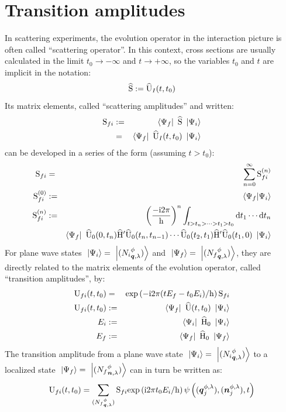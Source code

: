 \documentclass[10pt,a4paper,twoside,openany]{book}
\begin{document}
\section{Transition amplitudes}

In scattering experiments, the evolution operator in the interaction picture is often called ``scattering operator''. In this context, cross sections are usually calculated in the limit $t_0 \to - \infty$ and $t \to + \infty$, so the variables $t_0$ and $t$ are implicit in the notation:
\begin{equation*}
\widehat{\mathrm S} := \widehat{\mathrm U}_I({t},{t_0})
\end{equation*}
Its matrix elements, called ``scattering amplitudes'' and written:
\begin{eqnarray*}
\mathrm S_{{f}{i}} & := & \left\langle{\Psi_f}\right|\  \widehat{\mathrm S} \ \left|{\Psi_i}\right\rangle \\
& = & \left\langle{\Psi_f}\right|\  \widehat{\mathrm U}_I({t},{t_0}) \ \left|{\Psi_i}\right\rangle
\end{eqnarray*}
can be developed in a series of the form (assuming $t > t_0$):
\begin{eqnarray*}
\mathrm S_{{f}{i}} & = & \sum_{n=0}^\infty \mathrm S_{{f}{i}}^{({n})} \\
\mathrm S_{{f}{i}}^{({0})} & := & \left\langle{\Psi_f}|{\Psi_i}\right\rangle \\
\mathrm S_{{f}{i}}^{({n})} & := & \left( \frac{-\mathrm{i} 2 \pi} {\mathrm h} \right)^n \int_{t > t_n > \dotsb > t_1 > t_0} \mathrm dt_1 \dotsm \mathrm dt_n \\
&& \left\langle{\Psi_f}\right|\  \widehat{\mathrm U}_0({0},{t_n}) \widehat{\mathrm H}' \widehat{\mathrm U}_0({t_n},{t_{n-1}}) \dotsm \widehat{\mathrm U}_0({t_2},{t_1}) \widehat{\mathrm H}' \widehat{\mathrm U}_0({t_1},{0}) \ \left|{\Psi_i}\right\rangle
\end{eqnarray*}
For plane wave states $\ \left|{\Psi_i}\right\rangle = \ \left|{({N_i}^{\phi}_{{\boldsymbol{q}}, {\lambda}})}\right\rangle$ and $\ \left|{\Psi_f}\right\rangle = \ \left|{({N_f}^{\phi}_{{\boldsymbol{q}}, {\lambda}})}\right\rangle$, they are directly related to the matrix elements of the evolution operator, called ``transition amplitudes'', by:
\begin{eqnarray*}
\mathrm U_{{f}{i}}({t},{t_0}) & = & \mathrm{exp} \left( {-\mathrm{i} 2 \pi ( t E_f - t_0 E_i ) / \mathrm h} \right) \mathrm S_{{f}{i}} \\
\mathrm U_{{f}{i}}({t},{t_0}) & := & \left\langle{\Psi_f}\right|\  \widehat{\mathrm U}({t},{t_0}) \ \left|{\Psi_i}\right\rangle \\
E_i & := & \left\langle{\Psi_i}\right|\  \widehat{\mathrm H}_0 \ \left|{\Psi_i}\right\rangle \\
E_f & := & \left\langle{\Psi_f}\right|\  \widehat{\mathrm H}_0 \ \left|{\Psi_f}\right\rangle
\end{eqnarray*}
The transition amplitude from a plane wave state $\ \left|{\Psi_i}\right\rangle = \ \left|{({N_i}^{\phi}_{{\boldsymbol{q}}, {\lambda}})}\right\rangle$ to a localized state $\ \left|{\Psi_f}\right\rangle = \ \left|{({N_f}^{\phi}_{{\boldsymbol{n}}, {\lambda}})}\right\rangle$ can in turn be written as:
\begin{equation*}
\mathrm U_{{f}{i}}({t},{t_0}) = \sum_{({N_f}^{\phi}_{{\boldsymbol{q}}, {\lambda}})} \mathrm S_{{f}{i}} \mathrm{exp} \left( {\mathrm{i} 2 \pi t_0 E_i / \mathrm h} \right) \psi \left( ( \boldsymbol{q}^{\phi, \lambda}_j ), ( \boldsymbol{n}^{\phi, \lambda}_j ), t \right)
\end{equation*}
\end{document}
